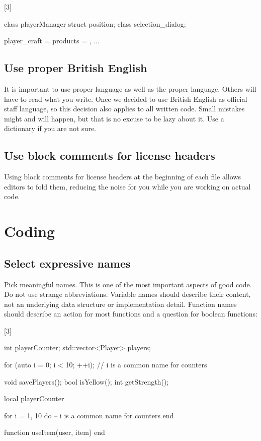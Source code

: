 \documentclass[a4paper,11pt]{scrreprt}
\newcommand{\marginMarker}[1]{%
\marginnote{%
    \hfill%
		\Huge{#1}%
}[3\baselineskip]%
}
\newcommand{\conforming}{%
\marginMarker{\textcolor{green}{\ding{51}}}%
}
\newcommand{\nonconforming}{%
\marginMarker{\textcolor{red}{\ding{55}}}%
}
\begin{document}
\nonconforming{}
\begin{cppBox}
class playerManager
struct position;
class selection_dialog;
\end{cppBox}
\begin{luaBox}[mathescape]
player_craft = {
    products = {},
    $\dots$
}
\end{luaBox}

\section{Use proper British English}
It is important to use proper language as well as the proper language. Others will have to read what you write. Once we decided to use British English as official staff language, so this decision also applies to all written code. Small mistakes might and will happen, but that is no excuse to be lazy about it. Use a dictionary if you are not sure.

\section{Use block comments for license headers}
Using block comments for license headers at the beginning of each file allows editors to fold them, reducing the noise for you while you are working on actual code.


\chapter{Coding}
\section{Select expressive names}
Pick meaningful names. This is one of the most important aspects of good code. Do not use strange abbreviations. Variable names should describe their content, not an underlying data structure or implementation detail. Function names should describe an action for most functions and a question for boolean functions:

\conforming{}
\begin{cppBox}
int playerCounter;
std::vector<Player> players;

for (auto i = 0; i < 10; ++i); // i is a common name for counters

void savePlayers();
bool isYellow();
int getStrength();
\end{cppBox}
\begin{luaBox}
local playerCounter

for i = 1, 10 do -- i is a common name for counters
end

function useItem(user, item)
end
\end{luaBox}
\end{document}
